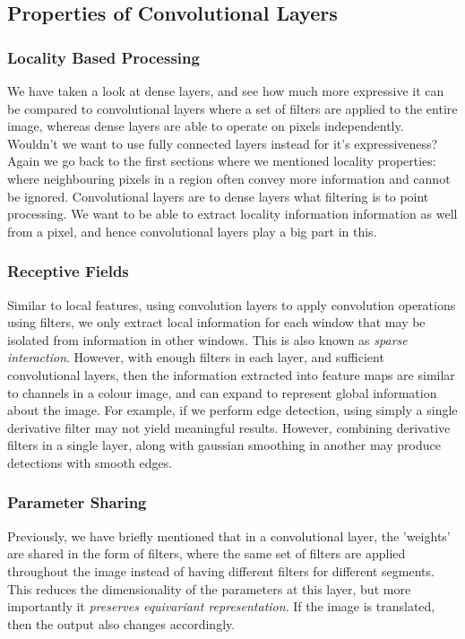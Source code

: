 \documentclass[12pt]{article}
\begin{document}
\subsection{Properties of Convolutional Layers}

\subsubsection{Locality Based Processing}

We have taken a look at dense layers, and see how much more expressive it can be compared to convolutional layers where a set of filters are applied to the entire image, whereas dense layers are able to operate on pixels independently. Wouldn't we want to use fully connected layers instead for it's expressiveness? Again we go back to the first sections where we mentioned locality properties: where neighbouring pixels in a region often convey more information and cannot be ignored. Convolutional layers are to dense layers what filtering is to point processing. We want to be able to extract locality information information as well from a pixel, and hence convolutional layers play a big part in this. 

\subsubsection{Receptive Fields}

Similar to local features, using convolution layers to apply convolution operations using filters, we only extract local information for each window that may be isolated from information in other windows. This is also known as \textit{sparse interaction}. However, with enough filters in each layer, and sufficient convolutional layers, then the information extracted into feature maps are similar to channels in a colour image, and can expand to represent global information about the image. For example, if we perform edge detection, using simply a single derivative filter may not yield meaningful results. However, combining derivative filters in a single layer, along with gaussian smoothing in another may produce detections with smooth edges.

\subsubsection{Parameter Sharing}

Previously, we have briefly mentioned that in a convolutional layer, the 'weights' are shared in the form of filters, where the same set of filters are applied throughout the image instead of having different filters for different segments. This reduces the dimensionality of the parameters at this layer, but more importantly it \textit{preserves equivariant representation}. If the image is translated, then the output also changes accordingly.
\end{document}
